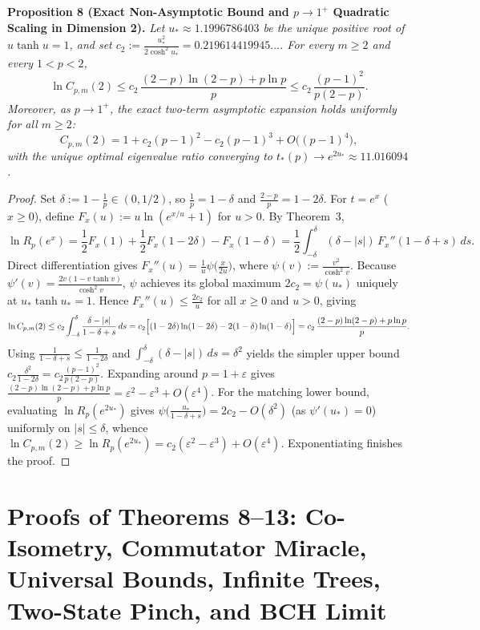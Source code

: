\documentclass[10pt,letterpaper]{article}
\begin{document}
\begin{tcolorbox}[lemmabox]
\textbf{Proposition 8 (Exact Non-Asymptotic Bound and $p \to 1^+$ Quadratic Scaling in Dimension 2).}
\emph{Let $u_* \approx 1.1996786403$ be the unique positive root of $u \tanh u = 1$, and set $c_2 := \frac{u_*^2}{2\cosh^2 u_*} = 0.219614419945\dots$. For every $m \ge 2$ and every $1 < p < 2$,}
\[
  \ln C_{p,m}(2) \le c_2\,\frac{(2-p)\ln(2-p) + p\ln p}{p} \le c_2\,\frac{(p-1)^2}{p(2-p)}.
\]
\emph{Moreover, as $p \to 1^+$, the exact two-term asymptotic expansion holds uniformly for all $m \ge 2$:}
\[
  C_{p,m}(2) = 1 + c_2(p - 1)^2 - c_2(p - 1)^3 + O\bigl((p - 1)^4\bigr),
\]
\emph{with the unique optimal eigenvalue ratio converging to $t_*(p) \to e^{2u_*} \approx 11.016094$.}
\end{tcolorbox}

\begin{proof}
Set $\delta := 1 - \frac{1}{p} \in (0, 1/2)$, so $\frac{1}{p} = 1 - \delta$ and $\frac{2-p}{p} = 1 - 2\delta$. For $t = e^x$ ($x \ge 0$), define $F_x(u) := u\ln(e^{x/u} + 1)$ for $u > 0$. By Theorem~3,
\[
  \ln R_p(e^x) = \frac{1}{2}F_x(1) + \frac{1}{2}F_x(1 - 2\delta) - F_x(1 - \delta)
  = \frac{1}{2}\int_{-\delta}^{\delta} (\delta - |s|)\,F_x''(1 - \delta + s)\,ds.
\]
Direct differentiation gives $F_x''(u) = \frac{1}{u}\psi\bigl(\frac{x}{2u}\bigr)$, where $\psi(v) := \frac{v^2}{\cosh^2 v}$. Because $\psi'(v) = \frac{2v(1 - v\tanh v)}{\cosh^2 v}$, $\psi$ achieves its global maximum $2c_2 = \psi(u_*)$ uniquely at $u_* \tanh u_* = 1$. Hence $F_x''(u) \le \frac{2c_2}{u}$ for all $x \ge 0$ and $u > 0$, giving
\[
  \ln C_{p,m}(2) \le c_2\int_{-\delta}^{\delta} \frac{\delta - |s|}{1 - \delta + s}\,ds
  = c_2\Bigl[(1-2\delta)\ln(1-2\delta) - 2(1-\delta)\ln(1-\delta)\Bigr]
  = c_2\,\frac{(2-p)\ln(2-p) + p\ln p}{p}.
\]
Using $\frac{1}{1-\delta+s} \le \frac{1}{1-2\delta}$ and $\int_{-\delta}^{\delta}(\delta-|s|)\,ds = \delta^2$ yields the simpler upper bound $c_2\frac{\delta^2}{1-2\delta} = c_2\frac{(p-1)^2}{p(2-p)}$. Expanding around $p = 1 + \varepsilon$ gives $\frac{(2-p)\ln(2-p) + p\ln p}{p} = \varepsilon^2 - \varepsilon^3 + O(\varepsilon^4)$. For the matching lower bound, evaluating $\ln R_p(e^{2u_*})$ gives $\psi\bigl(\frac{u_*}{1-\delta+s}\bigr) = 2c_2 - O(\delta^2)$ (as $\psi'(u_*) = 0$) uniformly on $|s| \le \delta$, whence $\ln C_{p,m}(2) \ge \ln R_p(e^{2u_*}) = c_2(\varepsilon^2 - \varepsilon^3) + O(\varepsilon^4)$. Exponentiating finishes the proof.
\end{proof}

\section{Proofs of Theorems 8--13: Co-Isometry, Commutator Miracle, Universal Bounds, Infinite Trees, Two-State Pinch, and BCH Limit}
\end{document}
